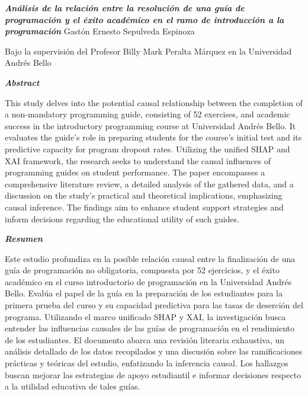 \begin{center}
    \textbf{\LARGE \textit{Análisis de la relación entre la resolución de una guía de programación y el éxito académico en el ramo de introducción a la programación}}
    \vfill
    Gastón Ernesto Sepulveda Espinoza

    Bajo la supervisión del Profesor Billy Mark Peralta Márquez en la Universidad Andrés Bello

\end{center}
\vfill

\newpage

\begin{center}
    \textbf{\LARGE \textit{Abstract}}
\end{center}

This study delves into the potential causal relationship between the completion of a non-mandatory programming guide, consisting of 52 exercises, and academic success in the introductory programming course at Universidad Andrés Bello. It evaluates the guide's role in preparing students for the course's initial test and its predictive capacity for program dropout rates. Utilizing the unified SHAP and XAI framework, the research seeks to understand the causal influences of programming guides on student performance. The paper encompasses a comprehensive literature review, a detailed analysis of the gathered data, and a discussion on the study's practical and theoretical implications, emphasizing causal inference. The findings aim to enhance student support strategies and inform decisions regarding the educational utility of such guides.


\begin{center}
    \textbf{\LARGE \textit{Resumen}}
\end{center}

Este estudio profundiza en la posible relación causal entre la finalización de una guía de programación no obligatoria, compuesta por 52 ejercicios, y el éxito académico en el curso introductorio de programación en la Universidad Andrés Bello. Evalúa el papel de la guía en la preparación de los estudiantes para la primera prueba del curso y su capacidad predictiva para las tasas de deserción del programa. Utilizando el marco unificado SHAP y XAI, la investigación busca entender las influencias causales de las guías de programación en el rendimiento de los estudiantes. El documento abarca una revisión literaria exhaustiva, un análisis detallado de los datos recopilados y una discusión sobre las ramificaciones prácticas y teóricas del estudio, enfatizando la inferencia causal. Los hallazgos buscan mejorar las estrategias de apoyo estudiantil e informar decisiones respecto a la utilidad educativa de tales guías.
